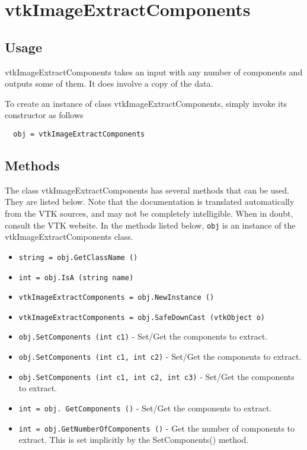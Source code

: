 \section{vtkImageExtractComponents}

\subsection{Usage}

 vtkImageExtractComponents takes an input with any number of components
 and outputs some of them.  It does involve a copy of the data.

To create an instance of class vtkImageExtractComponents, simply
invoke its constructor as follows
\begin{verbatim}
  obj = vtkImageExtractComponents
\end{verbatim}
\subsection{Methods}

The class vtkImageExtractComponents has several methods that can be used.
  They are listed below.
Note that the documentation is translated automatically from the VTK sources,
and may not be completely intelligible.  When in doubt, consult the VTK website.
In the methods listed below, \verb|obj| is an instance of the vtkImageExtractComponents class.
\begin{itemize}
\item  \verb|string = obj.GetClassName ()|

\item  \verb|int = obj.IsA (string name)|

\item  \verb|vtkImageExtractComponents = obj.NewInstance ()|

\item  \verb|vtkImageExtractComponents = obj.SafeDownCast (vtkObject o)|

\item  \verb|obj.SetComponents (int c1)| -  Set/Get the components to extract.

\item  \verb|obj.SetComponents (int c1, int c2)| -  Set/Get the components to extract.

\item  \verb|obj.SetComponents (int c1, int c2, int c3)| -  Set/Get the components to extract.

\item  \verb|int = obj. GetComponents ()| -  Set/Get the components to extract.

\item  \verb|int = obj.GetNumberOfComponents ()| -  Get the number of components to extract. This is set implicitly by the 
 SetComponents() method.

\end{itemize}
